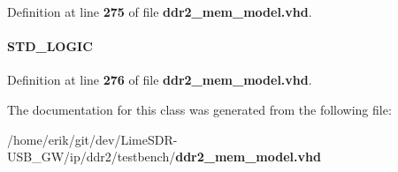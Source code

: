 Definition at line {\bf 275} of file {\bf ddr2\+\_\+mem\+\_\+model.\+vhd}.

\paragraph[{write\+\_\+valid\+\_\+r3}]{ {\bfseries \textcolor{comment}{S\+T\+D\+\_\+\+L\+O\+G\+IC}\textcolor{vhdlchar}{ }} \hspace{0.3cm}{\ttfamily [Signal]}}\label{classddr2__mem__model_1_1europa_a3371a21102c1da65000238ee3db51dd5}


Definition at line {\bf 276} of file {\bf ddr2\+\_\+mem\+\_\+model.\+vhd}.



The documentation for this class was generated from the following file\+:\begin{DoxyCompactItemize}
\item 
/home/erik/git/dev/\+Lime\+S\+D\+R-\/\+U\+S\+B\+\_\+\+G\+W/ip/ddr2/testbench/{\bf ddr2\+\_\+mem\+\_\+model.\+vhd}\end{DoxyCompactItemize}
